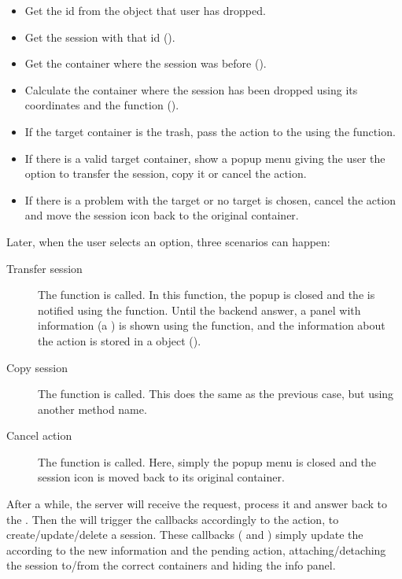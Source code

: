 \begin{itemize}
  \item Get the id from the object that user has dropped.
  \item Get the session with that id ().
  \item Get the container where the session was before ().
  \item Calculate the container where the session has been dropped using its coordinates and the function  ().
  \item If the target container is the trash, pass the action to the  using the  function.
  \item If there is a valid target container, show a popup menu giving the user the option to transfer the session, copy it or cancel the action.
  \item If there is a problem with the target or no target is chosen, cancel the action and move the session icon back to the original container.
\end{itemize}

Later, when the user selects an option, three scenarios can happen:

\begin{description}
  \item[Transfer session] The  function is called.
  In this function, the popup is closed and the  is notified using the  function.
  Until the backend answer, a panel with information (a ) is shown using the  function, and the information about the action is stored in a  object ().
  \item[Copy session] The  function is called.
  This does the same as the previous case, but using another method name.
  \item[Cancel action] The  function is called.
  Here, simply the popup menu is closed and the session icon is moved back to its original container.
\end{description}

After a while, the server will receive the request, process it and answer back to the .
Then the  will trigger the callbacks accordingly to the action, to create/update/delete a session.
These callbacks ( and ) simply update the  according to the new information and the pending action, attaching/detaching the session to/from the correct containers and hiding the info panel.


